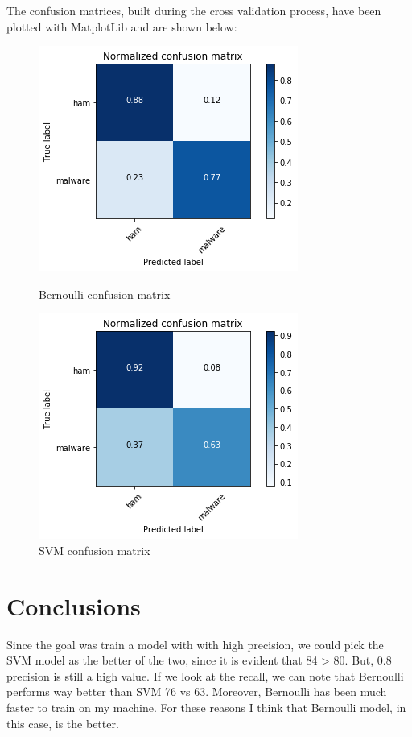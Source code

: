 \documentclass[12pt]{article}
\begin{document}
The confusion matrices, built during the cross validation process, have been plotted with MatplotLib and are shown below:
\begin{figure}
	\centering
	\begin{minipage}{.5\textwidth}
		\centering
		\includegraphics[width=.8\linewidth]{cnf_m_bernoulli.png}
		\caption{Bernoulli confusion matrix} %
		\label{fig:cnf_m_bernoulli}
	\end{minipage}%
	\begin{minipage}{.5\textwidth}
		\centering
		\includegraphics[width=.8\linewidth]{cnf_m_svm.png}
		\caption{SVM confusion matrix} %
		\label{fig:cnf_m_svm}
	\end{minipage}
\end{figure}

\section{Conclusions}
Since the goal was train a model with with high precision, we could pick the SVM model as the better of the two, since it is evident that 84 > 80. But, 0.8 precision is still a high value. If we look at the recall, we can note that Bernoulli performs way better than SVM 76 vs 63. Moreover, Bernoulli has been much faster to train on my machine. For these reasons I think that Bernoulli model, in this case, is the better. 
\end{document}
